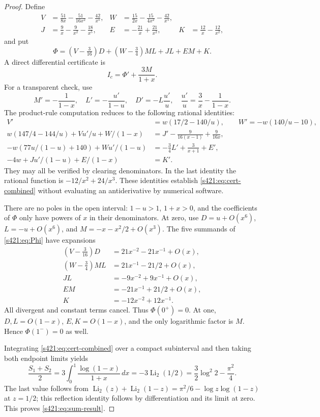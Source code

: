 \documentclass[11pt,a4paper]{article}
\theoremstyle{remark}\newtheorem{remark}[theorem]{Remark}
\newcommand{\Li}{\operatorname{Li}_2}
\numberwithin{equation}{section}
\begin{document}
\begin{proof}
Define
\begin{align*}
 V&=\frac{51}{8x}-\frac{51}{16x^2}-\frac{42}{x^5},&
 W&=\frac{15}{2x}-\frac{15}{4x^2}-\frac{42}{x^5},\\
 J&=\frac9x-\frac9{x^2}-\frac{18}{x^5},&
 E&=-\frac{21}{x}+\frac{21}{x^2},&K&=\frac{12}{x}-\frac{12}{x^2},
\end{align*}
and put
\begin{equation}\label{s421:eq:Phi}
 \Phi=(V-\tfrac3{16})D+(W-\tfrac34)ML+JL+EM+K.
\end{equation}
A direct differential certificate is
\begin{equation}\label{s421:eq:cert-combined}
 I_c=\Phi'+\frac{3M}{1+x}.
\end{equation}
For a transparent check, use
\[
 M'=-\frac1{1-x},\quad L'=-\frac{u'}{1-u},\quad
 D'=-L\frac{u'}u,\quad \frac{u'}u=\frac3x-\frac1{1-x}.
\]
The product-rule computation reduces to the following rational identities:
\begin{align*}
 V'&=w(17/2-140/u),\qquad W'=-w(140/u-10),\\
 w(147/4-144/u)+Vu'/u+W/(1-x)
 &=J'-\frac9{16(x-1)}+\frac9{16x},\\
 -w(77u/(1-u)+140)+Wu'/(1-u)
 &=-\frac34L'+\frac3{x+1}+E',\\
 -4w+Ju'/(1-u)+E/(1-x)&=K'.
\end{align*}
They may all be verified by clearing denominators. In the last identity the rational function is $-12/x^2+24/x^3$. These identities establish \eqref{s421:eq:cert-combined} without evaluating an antiderivative by numerical software.

There are no poles in the open interval: $1-u>1$, $1+x>0$, and the coefficients of $\Phi$ only have powers of $x$ in their denominators. At zero, use $D=u+O(x^6)$, $L=-u+O(x^6)$, and $M=-x-x^2/2+O(x^3)$. The five summands of \eqref{s421:eq:Phi} have expansions
\begin{align*}
 (V-\tfrac3{16})D&=21x^{-2}-21x^{-1}+O(x),\\
 (W-\tfrac34)ML&=21x^{-1}-21/2+O(x),\\
 JL&=-9x^{-2}+9x^{-1}+O(x),\\
 EM&=-21x^{-1}+21/2+O(x),\\
 K&=-12x^{-2}+12x^{-1}.
\end{align*}
All divergent and constant terms cancel. Thus $\Phi(0^+)=0$. At one, $D,L=O(1-x)$, $E,K=O(1-x)$, and the only logarithmic factor is $M$. Hence $\Phi(1^-)=0$ as well.

Integrating \eqref{s421:eq:cert-combined} over a compact subinterval and then taking both endpoint limits yields
\[
 \frac{S_1+S_2}{2}=3\int_0^1\frac{\log(1-x)}{1+x}\,dx
 =-3\Li(1/2)=\frac32\log^2 2-\frac{\pi^2}{4}.
\]
The last value follows from
$\Li(z)+\Li(1-z)=\pi^2/6-\log z\log(1-z)$ at $z=1/2$; this reflection identity follows by differentiation and its limit at zero. This proves \eqref{s421:eq:sum-result}.
\end{proof}
\end{document}
